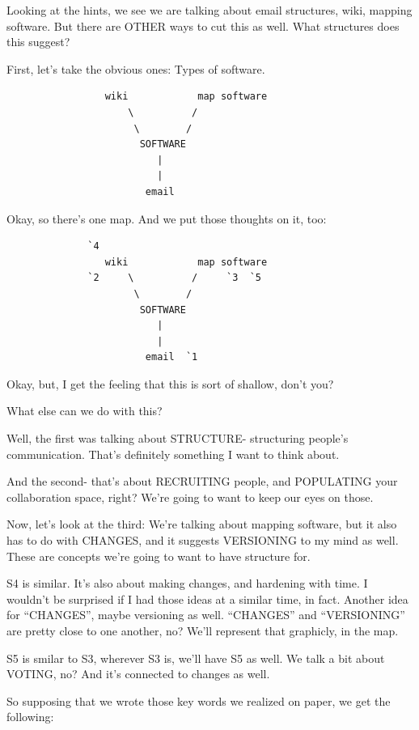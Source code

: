 \documentclass[oneside]{book}
\begin{document}
Looking at the hints, we see we are talking about email structures,
wiki, mapping software. But there are OTHER ways to cut this as
well. What structures does this suggest?

First, let's take the obvious ones: Types of software.

\begin{verbatim}
                 wiki            map software
                     \          /
                      \        /
                       SOFTWARE
                          |
                          |
                        email
\end{verbatim}

Okay, so there's one map. And we put those thoughts on it, too:

\begin{verbatim}
              `4
                 wiki            map software
              `2     \          /     `3  `5
                      \        /
                       SOFTWARE
                          |
                          |
                        email  `1
\end{verbatim}

Okay, but, I get the feeling that this is sort of shallow, don't you?

What else can we do with this?

Well, the first was talking about STRUCTURE- structuring people's
communication. That's definitely something I want to think about.

And the second- that's about RECRUITING people, and POPULATING your
collaboration space, right? We're going to want to keep our eyes on
those.

Now, let's look at the third: We're talking about mapping software,
but it also has to do with CHANGES, and it suggests VERSIONING to my
mind as well. These are concepts we're going to want to have structure
for.

S4 is similar. It's also about making changes, and hardening with
time. I wouldn't be surprised if I had those ideas at a similar time,
in fact. Another idea for ``CHANGES'', maybe versioning as
well. ``CHANGES'' and ``VERSIONING'' are pretty close to one another, no?
We'll represent that graphicly, in the map.

S5 is smilar to S3, wherever S3 is, we'll have S5 as well. We talk
a bit about VOTING, no? And it's connected to changes as well.

So supposing that we wrote those key words we realized on paper, we
get the following:
\end{document}
